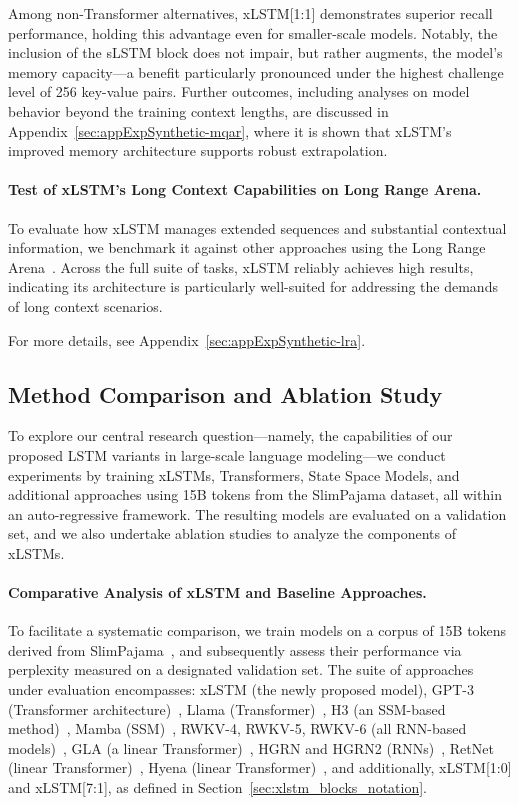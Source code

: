 Among non-Transformer alternatives, xLSTM[1:1] demonstrates superior recall performance, holding this advantage even for smaller-scale models. Notably, the inclusion of the sLSTM block does not impair, but rather augments, the model's memory capacity—a benefit particularly pronounced under the highest challenge level of 256 key-value pairs. Further outcomes, including analyses on model behavior beyond the training context lengths, are discussed in Appendix~\ref{sec:appExpSynthetic-mqar}, where it is shown that xLSTM’s improved memory architecture supports robust extrapolation.

\paragraph{Test of xLSTM's Long Context Capabilities on Long Range Arena.} To evaluate how xLSTM manages extended sequences and substantial contextual information, we benchmark it against other approaches using the Long Range Arena~\citep{Tay:21}. Across the full suite of tasks, xLSTM reliably achieves high results, indicating its architecture is particularly well-suited for addressing the demands of long context scenarios.

For more details, see Appendix~\ref{sec:appExpSynthetic-lra}.

\subsection{Method Comparison and Ablation Study}
\label{sec:ExpComparison}

To explore our central research question—namely, the capabilities of our proposed LSTM variants in large-scale language modeling—we conduct experiments by training xLSTMs, Transformers, State Space Models, and additional approaches using 15B tokens from the SlimPajama dataset, all within an auto-regressive framework. The resulting models are evaluated on a validation set, and we also undertake ablation studies to analyze the components of xLSTMs.

\paragraph{Comparative Analysis of xLSTM and Baseline Approaches.} To facilitate a systematic comparison, we train models on a corpus of 15B tokens derived from SlimPajama~\citep{Soboleva:23}, and subsequently assess their performance via perplexity measured on a designated validation set. The suite of approaches under evaluation encompasses: xLSTM (the newly proposed model), GPT-3 (Transformer architecture)~\citep{Brown:20short}, Llama (Transformer)~\citep{Touvron:23arxiv}, H3 (an SSM-based method)~\citep{Fu:23}, Mamba (SSM)~\citep{Gu:24arxiv}, RWKV-4, RWKV-5, RWKV-6 (all RNN-based models)~\citep{Peng:23arxivshort, Peng:24arxivshort}, GLA (a linear Transformer)~\citep{Yang:23arxiv}, HGRN and HGRN2 (RNNs)~\citep{Qin:23, Qin:24arxiv}, RetNet (linear Transformer)~\citep{Sun:23arxiv}, Hyena (linear Transformer)~\citep{Poli:23}, and additionally, xLSTM[1:0] and xLSTM[7:1], as defined in Section~\ref{sec:xlstm_blocks_notation}.

